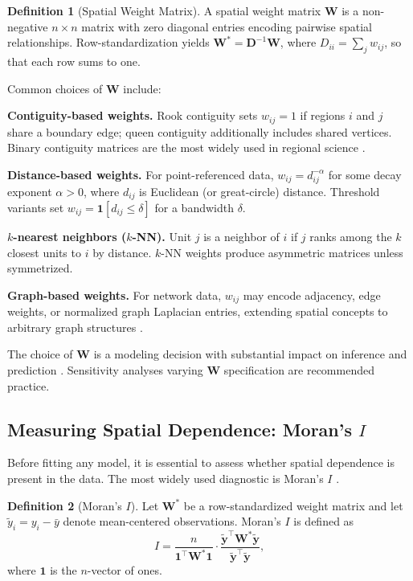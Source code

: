 \documentclass[conference]{IEEEtran}
\theoremstyle{definition}
\newtheorem{definition}{Definition}
\begin{document}
\begin{definition}[Spatial Weight Matrix]
A spatial weight matrix $\mathbf{W}$ is a non-negative $n \times n$ matrix with zero diagonal entries encoding pairwise spatial relationships. Row-standardization yields $\mathbf{W}^* = \mathbf{D}^{-1}\mathbf{W}$, where $D_{ii} = \sum_j w_{ij}$, so that each row sums to one.
\end{definition}

Common choices of $\mathbf{W}$ include:

\textbf{Contiguity-based weights.} Rook contiguity sets $w_{ij} = 1$ if regions $i$ and $j$ share a boundary edge; queen contiguity additionally includes shared vertices. Binary contiguity matrices are the most widely used in regional science \cite{anselin1988spatial}.

\textbf{Distance-based weights.} For point-referenced data, $w_{ij} = d_{ij}^{-\alpha}$ for some decay exponent $\alpha > 0$, where $d_{ij}$ is Euclidean (or great-circle) distance. Threshold variants set $w_{ij} = \mathbf{1}[d_{ij} \leq \delta]$ for a bandwidth $\delta$.

\textbf{$k$-nearest neighbors ($k$-NN).} Unit $j$ is a neighbor of $i$ if $j$ ranks among the $k$ closest units to $i$ by distance. $k$-NN weights produce asymmetric matrices unless symmetrized.

\textbf{Graph-based weights.} For network data, $w_{ij}$ may encode adjacency, edge weights, or normalized graph Laplacian entries, extending spatial concepts to arbitrary graph structures \cite{getis2009spatial}.

The choice of $\mathbf{W}$ is a modeling decision with substantial impact on inference and prediction \cite{halleck2015w}. Sensitivity analyses varying $\mathbf{W}$ specification are recommended practice.

\subsection{Measuring Spatial Dependence: Moran's $I$}

Before fitting any model, it is essential to assess whether spatial dependence is present in the data. The most widely used diagnostic is Moran's $I$ \cite{moran1950notes}.

\begin{definition}[Moran's $I$]
Let $\mathbf{W}^*$ be a row-standardized weight matrix and let $\tilde{y}_i = y_i - \bar{y}$ denote mean-centered observations. Moran's $I$ is defined as
\begin{equation}
I = \frac{n}{\mathbf{1}^\top \mathbf{W}^* \mathbf{1}} \cdot \frac{\tilde{\mathbf{y}}^\top \mathbf{W}^* \tilde{\mathbf{y}}}{\tilde{\mathbf{y}}^\top \tilde{\mathbf{y}}},
\end{equation}
where $\mathbf{1}$ is the $n$-vector of ones.
\end{definition}
\end{document}
